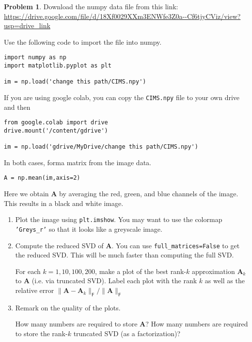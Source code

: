 \documentclass[12pt]{article}
\theoremstyle{definition}
\newtheorem{problem}{Problem}
\renewcommand{\vec}{\mathbf}
\newcommand{\F}{\mathsf{F}}
\begin{document}
\clearpage
\begin{problem}

    Download the numpy data file from this link: \url{https://drive.google.com/file/d/18Xf0029XXm3ENWfe3Z0a--Cf6tjyCViz/view?usp=drive_link}

Use the following code to import the file into numpy.

\begin{lstlisting}
import numpy as np
import matplotlib.pyplot as plt

im = np.load('change this path/CIMS.npy')
\end{lstlisting}

    If you are using google colab, you can copy the \lstinline{CIMS.npy} file to your own drive and then 
\begin{lstlisting}
from google.colab import drive
drive.mount('/content/gdrive')

im = np.load('gdrive/MyDrive/change this path/CIMS.npy')
\end{lstlisting}

In both cases, forma matrix from the image data.
\begin{lstlisting}
A = np.mean(im,axis=2)
\end{lstlisting}
Here we obtain $\vec{A}$ by averaging the red, green, and blue channels of the image.
This results in a black and white image.

    \begin{enumerate}
        \item Plot the image using \lstinline{plt.imshow}.
            You may want to use the colormap \texttt{'Greys\_r'} so that it looks like a greyscale image.
        \item
            Compute the reduced SVD of $\vec{A}$. 
            You can use \lstinline{full_matrices=False} to get the reduced SVD.
            This will be much faster than computing the full SVD.

            For each $k=1,10,100,200$, make a plot of the best rank-$k$ approximation $\vec{A}_k$ to $\vec{A}$ (i.e. via truncated SVD).
            Label each plot with the rank $k$ as well as the relative error $\| \vec{A} - \vec{A}_k \|_\F / \| \vec{A} \|_\F$
        \item 
            Remark on the quality of the plots. 
            
            How many numbers are required to store $\vec{A}$?
            How many numbers are required to store the rank-$k$ truncated SVD (as a factorization)?
    \end{enumerate}

\end{problem}
\clearpage
\end{document}
